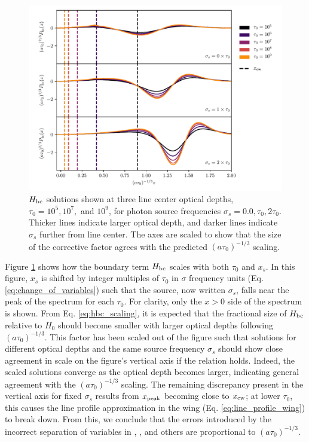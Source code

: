 \documentclass{aastex63}
\begin{document}
\begin{figure}
    \centering
    \includegraphics[width=\textwidth]{xinit.pdf}
    \caption{$H_{\rm bc}$ solutions shown at three line center optical depths, $\tau_0=10^5, 10^7,$ and $10^9$, for photon source frequencies $\sigma_s=0.0, \tau_0, 2\tau_0$. Thicker lines indicate larger optical depth, and darker lines indicate $\sigma_s$ further from line center. The axes are scaled to show that the size of the corrective factor agrees with the predicted $(a\tau_0)^{-1/3}$ scaling.}
    \label{fig:xinit}
\end{figure}

Figure \ref{fig:xinit} shows how the boundary term $H_{\rm bc}$ scales with both $\tau_0$ and $x_s$.%
In this figure, $x_s$ is shifted by integer multiples of $\tau_0$ in $\sigma$ frequency units (Eq. \ref{eq:change_of_variables}) such that the source, now written $\sigma_s$, falls near the peak of the spectrum for each $\tau_0$. For clarity, only the $x > 0$ side of the spectrum is shown. From Eq. \ref{eq:hbc_scaling}, it is expected that the fractional size of $H_{\rm bc}$ relative to $H_0$ should become smaller with larger optical depths following $(a\tau_0)^{-1/3}$. This factor has been scaled out of the figure such that solutions for different optical depths and the same source frequency $\sigma_s$ should show close agreement in scale on the figure's vertical axis if the relation holds. Indeed, the scaled solutions converge as the optical depth becomes larger, indicating general agreement with the $(a\tau_0)^{-1/3}$ scaling. The remaining discrepancy present in the vertical axis for fixed $\sigma_s$ results from $x_{\rm peak}$ becoming close to $x_{\rm cw}$; at lower $\tau_0$, this causes the line profile approximation in the wing (Eq. \ref{eq:line_profile_wing}) to break down. From this, we conclude that the errors introduced by the incorrect separation of variables in \cite{1973MNRAS.162...43H}, \cite{1990ApJ...350..216N}, \cite{2006ApJ...649...14D} and others are proportional to $(a\tau_0)^{-1/3}$.
\end{document}
